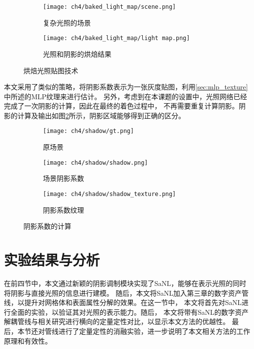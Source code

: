 \begin{figure}[H]
  \centering
  \begin{subfigure}[t]{0.45\textwidth}
    \centering
    \texttt{[image: ch4/baked\_light\_map/scene.png]}
    \caption{复杂光照的场景}
  \end{subfigure}
  \hspace{0.05\textwidth} %
  \begin{subfigure}[t]{0.45\textwidth}
    \centering
    \texttt{[image: ch4/baked\_light\_map/light map.png]}
    \caption{光照和阴影的烘焙结果}
  \end{subfigure}
  \caption{烘焙光照贴图技术}
  \label{fig:baked_light_map}
\end{figure}

本文采用了类似的策略，将阴影系数表示为一张灰度贴图，利用\ref{sec:mlp_texture}中所述的MLP纹理来进行估计。
另外，考虑到在本课题的设置中，光照网络已经完成了一次阴影的计算，因此在最终的着色过程中，
不再需要重复计算阴影。阴影的计算及输出如图\ref{fig:shadow_mapping}所示，阴影区域能够得到正确的区分。

\begin{figure}[H]
  \centering
  \begin{subfigure}[c]{0.27\textwidth}
    \centering
    \texttt{[image: ch4/shadow/gt.png]}
    \caption{原场景}
  \end{subfigure}
  \hspace{0.05\textwidth} %
  \begin{subfigure}[c]{0.27\textwidth}
    \centering
    \texttt{[image: ch4/shadow/shadow.png]}
    \caption{场景阴影系数}
  \end{subfigure}
  \hspace{0.05\textwidth} %
  \begin{subfigure}[c]{0.27\textwidth}
    \centering
    \texttt{[image: ch4/shadow/shadow\_texture.png]}
    \caption{阴影系数纹理}
  \end{subfigure}
  \caption{阴影系数的计算}
  \label{fig:shadow_mapping}
\end{figure}

\section{实验结果与分析}

在前四节中，本文通过新颖的阴影调制模块实现了SaNL，能够在表示光照的同时将阴影与直接光照的信息进行建模。
随后，本文将SaNL加入第三章的数字资产管线，以提升对网格体和表面属性分解的效果。在这一节中，
本文将首先对SaNL进行全面的实验，以验证其对光照的表示能力。随后，
本文将带有SaNL的数字资产解耦管线与相关研究进行横向的定量定性对比，以显示本文方法的优越性。
最后，本节还对管线进行了定量定性的消融实验，进一步说明了本文相关方法的工作原理和有效性。


